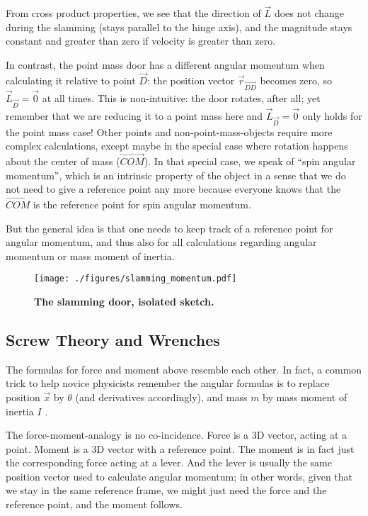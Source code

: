 From cross product properties, we see that the direction of \(\vec{L}\) does not change during the slamming (stays parallel to the hinge axis), and the magnitude stays constant and greater than zero if velocity is greater than zero.

In contrast, the point mass door has a different angular momentum when calculating it relative to point \(\vec{D}\): the position vector \(\vec{r}_{\vec{DD}}\) becomes zero, so \(\vec{L}_{\vec{D}} = \vec{0}\) at all times.
This is non-intuitive: the door rotates, after all; yet remember that we are reducing it to a point mass here and \(\vec{L}_{\vec{D}} = \vec{0}\) only holds for the point mass case!
Other points and non-point-mass-objects require more complex calculations, except maybe in the special case where rotation happens about the center of mass (\(\vec{COM}\)).
In that special case, we speak of ``spin angular momentum'', which is an intrinsic property of the object in a sense that we do not need to give a reference point any more because everyone knows that the \(\vec{COM}\) is the reference point for spin angular momentum.


But the general idea is that one needs to keep track of a reference point for angular momentum, and thus also for all calculations regarding angular momentum or mass moment of inertia.


\begin{figure}[b!]
\centering
\texttt{[image: ./figures/slamming\_momentum.pdf]}
\caption{\label{fig:slamming_momentum}\textbf{The slamming door, isolated sketch.}}
\end{figure}



\FloatBarrier
\subsection{Screw Theory and Wrenches}
\label{sec:org160c425}

The formulas for force and moment above resemble each other.
In fact, a common trick to help novice physicists remember the angular formulas is to replace position \(\vec{x}\) by \(\theta\) (and derivatives accordingly), and mass \(m\) by mass moment of inertia \(I\) \citep{Tipler2007}.

The force-moment-analogy is no co-incidence.
Force is a 3D vector, acting at a point.
Moment is a 3D vector with a reference point.
The moment is in fact just the corresponding force acting at a lever.
And the lever is usually the same position vector used to calculate angular momentum; in other words, given that we stay in the same reference frame, we might just need the force and the reference point, and the moment follows.

